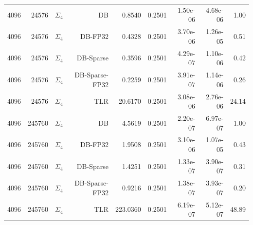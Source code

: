 \begin{tabular}{|r|r|r|r|r|r|r|r|r|}
  4096 & 24576 & $\Sigma_4$ & DB & 0.8540 & 0.2501 & 1.50e-06 & 4.68e-06 & 1.00 \\
  4096 & 24576 & $\Sigma_4$ & DB-FP32 & 0.4328 & 0.2501 & 3.70e-06 & 1.26e-05 & 0.51 \\
  4096 & 24576 & $\Sigma_4$ & DB-Sparse & 0.3596 & 0.2501 & 4.29e-07 & 1.10e-06 & 0.42 \\
  4096 & 24576 & $\Sigma_4$ & DB-Sparse-FP32 & 0.2259 & 0.2501 & 3.91e-07 & 1.14e-06 & 0.26 \\
  4096 & 24576 & $\Sigma_4$ & TLR & 20.6170 & 0.2501 & 3.08e-06 & 2.76e-06 & 24.14 \\
  4096 & 245760 & $\Sigma_4$ & DB & 4.5619 & 0.2501 & 2.20e-07 & 6.97e-07 & 1.00 \\
  4096 & 245760 & $\Sigma_4$ & DB-FP32 & 1.9508 & 0.2501 & 3.10e-06 & 1.07e-05 & 0.43 \\
  4096 & 245760 & $\Sigma_4$ & DB-Sparse & 1.4251 & 0.2501 & 1.33e-07 & 3.90e-07 & 0.31 \\
  4096 & 245760 & $\Sigma_4$ & DB-Sparse-FP32 & 0.9216 & 0.2501 & 1.38e-07 & 3.93e-07 & 0.20 \\
  4096 & 245760 & $\Sigma_4$ & TLR & 223.0360 & 0.2501 & 6.19e-07 & 5.12e-07 & 48.89 \\
  \hline
\end{tabular}
